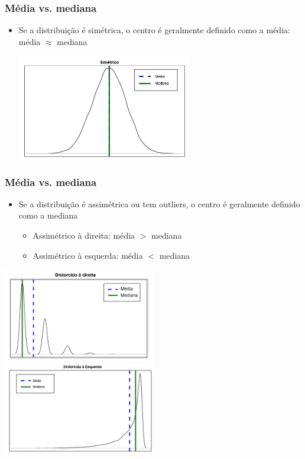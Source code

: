 \begin{frame}
\frametitle{Média vs. mediana}

\begin{itemize}
\justifying
\item Se a distribuição é simétrica, o centro é geralmente definido como a média: média $\approx$ mediana

\begin{center}
\includegraphics[width=0.6\textwidth]{1-6_numerical_data/sym.png}
\end{center}

\end{itemize}

\end{frame}

\begin{frame}
\frametitle{Média vs. mediana}

\begin{itemize}
\justifying
\item Se a distribuição é assimétrica ou tem outliers, o centro é geralmente definido como a mediana
\begin{itemize}
\item Assimétrico à direita: média $>$ mediana
\item Assimétrico à esquerda: média $<$ mediana \\
\end{itemize}

\end{itemize}

\begin{center}
\includegraphics[width=0.5\textwidth]{1-6_numerical_data/rs.png}
\includegraphics[width=0.5\textwidth]{1-6_numerical_data/ls.png}\\
\end{center}

\end{frame}

